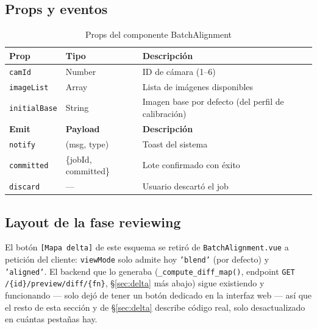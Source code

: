 \subsection{Props y eventos}

\begin{table}[H]
\centering
\caption{Props del componente BatchAlignment}
\begin{tabular}{L{3cm} L{2.5cm} L{7cm}}
\toprule
\textbf{Prop} & \textbf{Tipo} & \textbf{Descripción} \\
\midrule
\texttt{camId}       & Number & ID de cámara (1--6) \\
\texttt{imageList}   & Array  & Lista de imágenes disponibles \\
\texttt{initialBase} & String & Imagen base por defecto (del perfil de calibración) \\
\midrule
\textbf{Emit} & \textbf{Payload} & \textbf{Descripción} \\
\midrule
\texttt{notify}    & (msg, type) & Toast del sistema \\
\texttt{committed} & \{jobId, committed\} & Lote confirmado con éxito \\
\texttt{discard}   & — & Usuario descartó el job \\
\bottomrule
\end{tabular}
\end{table}

\subsection{Layout de la fase reviewing}

\begin{warnbox}
El botón \texttt{[Mapa delta]} de este esquema se retiró de \texttt{BatchAlignment.vue} a
petición del cliente: \texttt{viewMode} solo admite hoy \texttt{'blend'} (por defecto) y
\texttt{'aligned'}. El backend que lo generaba (\texttt{\_compute\_diff\_map()}, endpoint
\texttt{GET /\{id\}/preview/diff/\{fn\}}, \S\ref{sec:delta} más abajo) sigue existiendo y
funcionando --- solo dejó de tener un botón dedicado en la interfaz web --- así que el resto de
esta sección y de \S\ref{sec:delta} describe código real, solo desactualizado en cuántas
pestañas hay.
\end{warnbox}

